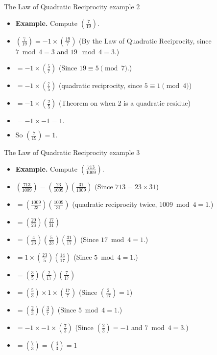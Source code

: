 \documentclass{beamer}
\begin{document}
\begin{frame}{The Law of Quadratic Reciprocity example 2}

\begin{itemize}
  \item \textbf{Example.} Compute $(\frac{7}{19})$.
  \item $(\frac{7}{19}) = -1\times(\frac{19}{7})$ (By the Law of Quadratic Reciprocity, since $7\bmod4=3$ and $19\mod4 = 3$.)
  \item $= -1\times(\frac{5}{7})$ (Since $19\equiv 5 \pmod {7}$.)
  \item $= -1\times(\frac{7}{5})$ (quadratic reciprocity, since $5\equiv 1 \pmod 4$)
  \item $= -1\times(\frac{2}{5})$ (Theorem on when 2 is a quadratic residue)
  \item $= -1\times-1 = 1.$
  \item So $(\frac{7}{19}) = 1$.
\end{itemize}
\end{frame}


\begin{frame}{The Law of Quadratic Reciprocity example 3}

\begin{itemize}
  \item \textbf{Example.} Compute $(\frac{713}{1009})$.
  \item $(\frac{713}{1009}) = (\frac{23}{1009})(\frac{31}{1009})$ (Since $713 = 23\times 31$)
  \item $= (\frac{1009}{23})(\frac{1009}{31})$ (quadratic reciprocity twice, $1009 \bmod 4 = 1$.)
  \item $= (\frac{20}{23})(\frac{17}{31})$
  \item $= (\frac{4}{23})(\frac{5}{23})(\frac{31}{17})$ (Since $17\bmod 4 = 1$.)
  \item $= 1 \times (\frac{23}{5})(\frac{14}{17})$ (Since $5\bmod 4 = 1$.)
  \item $=(\frac{3}{5})(\frac{2}{17})(\frac{7}{17})$
  \item $=(\frac{5}{3})\times 1 \times (\frac{17}{7})$ (Since $(\frac{2}{17}) = 1$)
  \item $=(\frac{2}{3}) (\frac{3}{7})$ (Since $5 \bmod 4 = 1$.)
  \item $=-1 \times -1\times(\frac{7}{3})$ (Since $(\frac{2}{3})=-1$ and $7 \bmod 4 = 3$.)
  \item $=(\frac{7}{3})=(\frac{4}{3}) = 1$
\end{itemize}
\end{frame}
\end{document}
